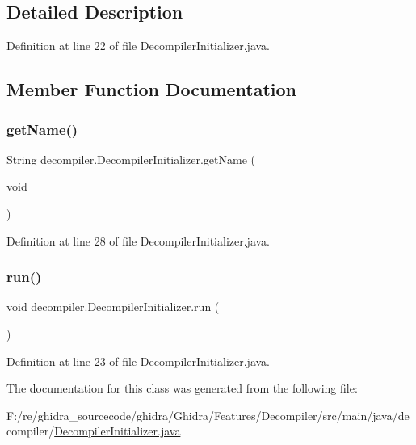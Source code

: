 \subsection{Detailed Description}


Definition at line 22 of file Decompiler\+Initializer.\+java.



\subsection{Member Function Documentation}
\mbox{\label{classdecompiler_1_1_decompiler_initializer_afda51c6992d7f8d8a172180910e3db26}} 
\subsubsection{\texorpdfstring{getName()}{getName()}}
{\footnotesize\ttfamily String decompiler.\+Decompiler\+Initializer.\+get\+Name (\begin{DoxyParamCaption}\item[{void}]{ }\end{DoxyParamCaption})\hspace{0.3cm}{\ttfamily [inline]}}



Definition at line 28 of file Decompiler\+Initializer.\+java.

\mbox{\label{classdecompiler_1_1_decompiler_initializer_acfc614400e06de7d55d4a07f6ec4af82}} 
\subsubsection{\texorpdfstring{run()}{run()}}
{\footnotesize\ttfamily void decompiler.\+Decompiler\+Initializer.\+run (\begin{DoxyParamCaption}{ }\end{DoxyParamCaption})\hspace{0.3cm}{\ttfamily [inline]}}



Definition at line 23 of file Decompiler\+Initializer.\+java.



The documentation for this class was generated from the following file\+:\begin{DoxyCompactItemize}
\item 
F\+:/re/ghidra\+\_\+sourcecode/ghidra/\+Ghidra/\+Features/\+Decompiler/src/main/java/decompiler/\mbox{\hyperlink{_decompiler_initializer_8java}{Decompiler\+Initializer.\+java}}\end{DoxyCompactItemize}
